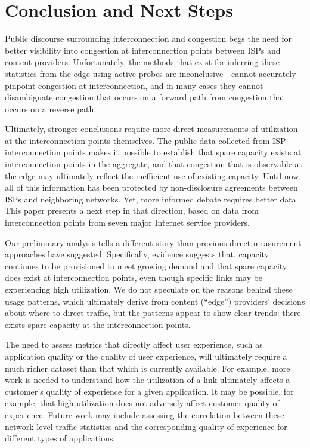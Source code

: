 \section{Conclusion and Next Steps}\label{sec:conclusion}

Public discourse surrounding interconnection and congestion begs the need
for better visibility into congestion at interconnection points between
ISPs and content providers.  Unfortunately, the methods that exist for inferring
these statistics from the edge using active probes are
inconclusive---cannot accurately pinpoint congestion at interconnection,
and in many cases they cannot disambiguate congestion that occurs on a
forward path from congestion that occurs on a reverse path.

Ultimately, stronger conclusions require more direct measurements of
utilization at the interconnection points themselves. The public data
collected from ISP interconnection points makes it possible to establish
that spare capacity exists at interconnection points in the aggregate,
and that congestion that is observable at the edge may ultimately
reflect the inefficient use of existing capacity.  Until now, all of
this information has been protected by non-disclosure agreements
between ISPs and neighboring networks. Yet, more informed debate requires better data.  This
paper presents a next step in that direction, based on data from
interconnection points from seven major Internet service providers. 

Our preliminary analysis tells a different story than previous direct
measurement approaches have suggested. Specifically, evidence suggests
that, capacity continues to be provisioned to meet growing
demand and that spare capacity does exist at interconnection points,
even though specific links may be experiencing high utilization. We do not speculate on the reasons behind these usage
patterns, which ultimately derive from content (``edge'') providers'
decisions about where to direct traffic, but the patterns appear to show
clear trends: there exists spare capacity at the interconnection points.

The need to assess metrics that directly affect user experience, such as
application quality or the quality of user experience, 
will ultimately require a much richer dataset than that which is
currently available. For example, more work is needed to understand how
the utilization of a link ultimately affects a customer's quality of
experience for a given application. It may be possible, for example,
that high utilization does not adversely affect customer quality of
experience. Future work may include assessing the correlation between
these network-level traffic statistics and the corresponding quality of
experience for different types of applications. 
